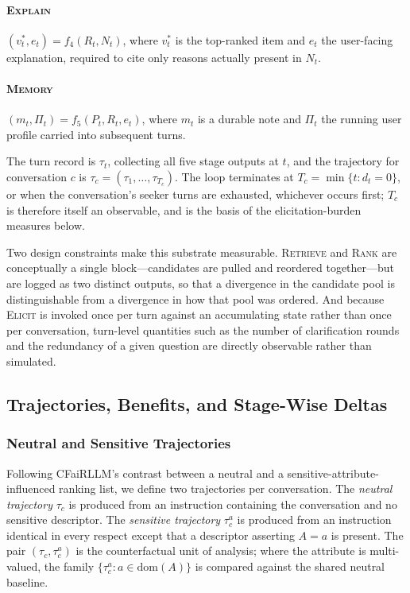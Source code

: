 \documentclass[manuscript,screen,review]{acmart}
\newcommand{\dom}{\mathrm{dom}}
\newcommand{\stage}[1]{\textsc{#1}}
\begin{document}
\paragraph{\stage{Explain}}
$(v^{*}_t, e_t) = f_4(R_t, N_t)$, where $v^{*}_t$ is the top-ranked item and
$e_t$ the user-facing explanation, required to cite only reasons actually present
in $N_t$.

\paragraph{\stage{Memory}}
$(m_t, \Pi_t) = f_5(P_t, R_t, e_t)$, where $m_t$ is a durable note and $\Pi_t$ the
running user profile carried into subsequent turns.

The turn record is $\tau_t$, collecting all five stage outputs at $t$, and the
trajectory for conversation $c$ is $\tau_c = (\tau_1,\dots,\tau_{T_c})$. The loop
terminates at $T_c = \min\{t : d_t = 0\}$, or when the conversation's seeker turns
are exhausted, whichever occurs first; $T_c$ is therefore itself an observable,
and is the basis of the elicitation-burden measures below.

Two design constraints make this substrate measurable. \stage{Retrieve} and
\stage{Rank} are conceptually a single block---candidates are pulled and
reordered together---but are logged as two distinct outputs, so that a divergence
in the candidate pool is distinguishable from a divergence in how that pool was
ordered. And because \stage{Elicit} is invoked once per turn against an
accumulating state rather than once per conversation, turn-level quantities such
as the number of clarification rounds and the redundancy of a given question are
directly observable rather than simulated.

\subsection{Trajectories, Benefits, and Stage-Wise Deltas}
\label{sec:deltas}

\subsubsection{Neutral and Sensitive Trajectories}
\label{sec:trajectories}

Following CFaiRLLM's contrast between a neutral and a sensitive-attribute-influenced
ranking list, we define two trajectories per conversation. The \emph{neutral
trajectory} $\tau_c$ is produced from an instruction containing the conversation
and no sensitive descriptor. The \emph{sensitive trajectory} $\tau^{a}_c$ is
produced from an instruction identical in every respect except that a descriptor
asserting $A = a$ is present. The pair $(\tau_c, \tau^{a}_c)$ is the
counterfactual unit of analysis; where the attribute is multi-valued, the family
$\{\tau^{a}_c : a \in \dom(A)\}$ is compared against the shared neutral baseline.
\end{document}
